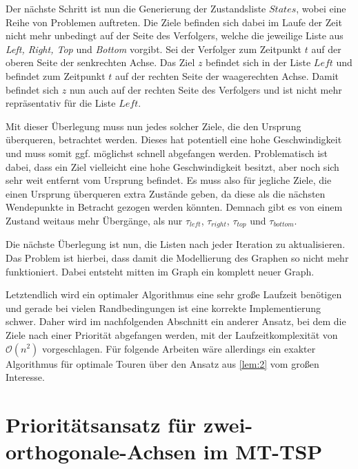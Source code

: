 \documentclass[german,version-2019-11]{uzl-thesis}
\begin{document}
Der nächste Schritt ist nun die Generierung der Zustandsliste $States$, wobei eine Reihe von Problemen auftreten. Die Ziele befinden sich dabei im Laufe der Zeit nicht mehr unbedingt auf der Seite des Verfolgers, welche die jeweilige Liste aus \emph{Left, Right, Top} und \emph{Bottom} vorgibt. Sei der Verfolger zum Zeitpunkt $t$ auf der oberen Seite der senkrechten Achse. Das Ziel $z$ befindet sich in der Liste $Left$ und befindet zum Zeitpunkt $t$ auf der rechten Seite der waagerechten Achse. Damit befindet sich $z$ nun auch auf der rechten Seite des Verfolgers und ist nicht mehr repräsentativ für die Liste $Left$. 

Mit dieser Überlegung muss nun jedes solcher Ziele, die den Ursprung überqueren, betrachtet werden. Dieses hat potentiell eine hohe Geschwindigkeit und muss somit ggf. möglichst schnell abgefangen werden. Problematisch ist dabei, dass ein Ziel vielleicht eine hohe Geschwindigkeit besitzt, aber noch sich sehr weit entfernt vom Ursprung befindet. Es muss also für jegliche Ziele, die einen Ursprung überqueren extra Zustände geben, da diese als die nächsten Wendepunkte in Betracht gezogen werden könnten. Demnach gibt es von einem Zustand weitaus mehr Übergänge, als nur $\tau_{left}$, $\tau_{right}$, $\tau_{top}$ und $\tau_{bottom}$. 

Die nächste Überlegung ist nun, die Listen nach jeder Iteration zu aktualisieren. Das Problem ist hierbei, dass damit die Modellierung des Graphen so nicht mehr funktioniert. Dabei entsteht mitten im Graph ein komplett neuer Graph. 
 
Letztendlich wird ein optimaler Algorithmus eine sehr große Laufzeit benötigen und gerade bei vielen Randbedingungen ist eine korrekte Implementierung schwer. Daher wird im nachfolgenden Abschnitt ein anderer Ansatz, bei dem die Ziele nach einer Priorität abgefangen werden, mit der Laufzeitkomplexität von $\mathcal{O}(n^2)$ vorgeschlagen. Für folgende Arbeiten wäre allerdings ein exakter Algorithmus für optimale Touren über den Ansatz aus \ref{lem:2} vom großen Interesse.

\section{Prioritätsansatz für zwei-orthogonale-Achsen im MT-TSP}
\end{document}

